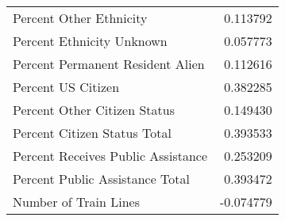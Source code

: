 \begin{tabular}{lr}
    Percent Other Ethnicity             & 0.113792                     \\
    Percent Ethnicity Unknown           & 0.057773                     \\
    Percent Permanent Resident Alien    & 0.112616                     \\
    Percent US Citizen                  & 0.382285                     \\
    Percent Other Citizen Status        & 0.149430                     \\
    Percent Citizen Status Total        & 0.393533                     \\
    Percent Receives Public Assistance  & 0.253209                     \\
    Percent Public Assistance Total     & 0.393472                     \\
    Number of Train Lines               & -0.074779                    \\

\end{tabular}
